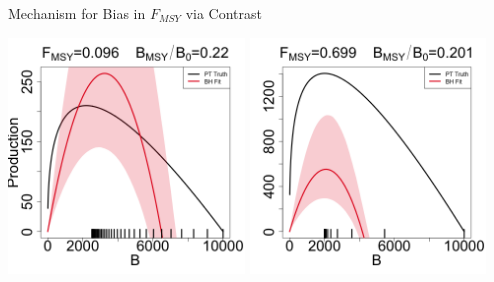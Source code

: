 \documentclass[ xcolor = pdftex, dvipsnames, table ]{beamer}
\begin{document}
\begin{frame}{Mechanism for Bias in $F_{MSY}$ via Contrast}
\begin{minipage}[h!]{0.50\textwidth}
{\includegraphics[width=0.47\textwidth]{../../ptNew/srrCompareFlatT30X0.096Z0.22.png}
\includegraphics[width=0.47\textwidth]{../../ptNew/srrCompareFlatT30X0.699Z0.201.png}
}
\end{minipage}
\end{frame}
\end{document}

